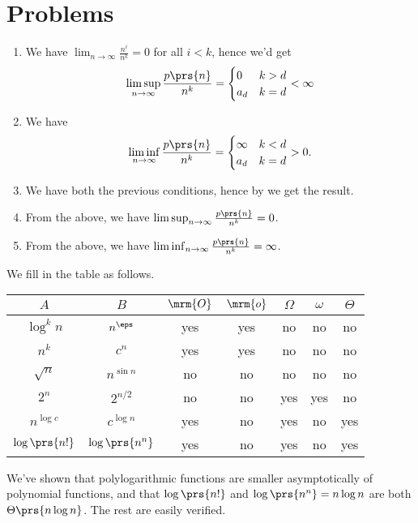 \documentclass[oneside]{scrbook}
\theoremstyle{definition}
\begin{document}
\section*{Problems}

\begin{problem}
\begin{enumerate}[label = \alph*.]
\item We have $\lim_{n \to \infty} \frac{n^i}{n^k} = 0$ for all $i < k$, hence we'd get
\[\limsup_{n \to \infty} \frac{p\prs{n}}{n^k} =
\begin{cases}
0 & k > d \\
a_d & k = d
\end{cases}
< \infty\]

\item We have \[\liminf_{n \to \infty} \frac{p\prs{n}}{n^k} =
\begin{cases}
\infty & k < d \\
a_d & k = d
\end{cases} > 0 \text{.}\]

\item We have both the previous conditions, hence by  we get the result.

\item From the above, we have $\limsup_{n \to \infty} \frac{p\prs{n}}{n^k} = 0$.

\item From the above, we have $\liminf_{n \to \infty} \frac{p\prs{n}}{n^k} = \infty$.
\end{enumerate}
\end{problem}

\begin{problem}
We fill in the table as follows.
\begin{center}
\begin{tabular}{c c | c | c | c | c | c |}
$A$ & $B$ & $\mrm{O}$ & $\mrm{o}$ & $\Omega$ & $\omega$ & $\Theta$
\\
\hline
$\log^k n$ & $n^\eps$ & yes & yes & no & no & no \\
\hline
$n^k$ & $c^n$ & yes & yes & no & no & no \\
\hline
$\sqrt{n}$ & $n^{\sin n}$ & no & no & no & no & no \\
\hline
$2^n$ & $2^{n/2}$ & no & no & yes & yes & no \\
\hline
$n^{\log c}$ & $c^{\log n}$ & yes & no & yes & no & yes \\
\hline
$\log\prs{n!}$ & $\log\prs{n^n}$ & yes & no & yes & no & yes \\
\hline
\end{tabular}
\end{center}

We've shown that polylogarithmic functions are smaller asymptotically of polynomial functions, and that $\log\prs{n!}$ and $\log\prs{n^n} = n \log n$ are both $\Theta\prs{n \log n}$. The rest are easily verified.
\end{problem}
\end{document}

